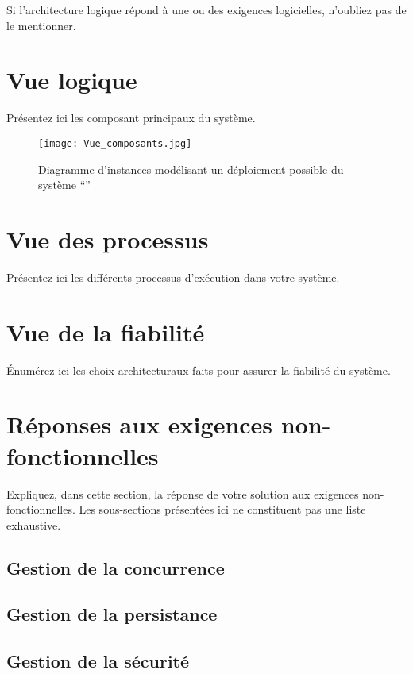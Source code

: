 Si l'architecture logique répond à une ou des exigences logicielles, n'oubliez pas de le mentionner.

\section{Vue logique}

Présentez ici les composant principaux du système.

\begin{figure}[!htbp]
\begin{center}
\caption{Diagramme d'instances modélisant un déploiement possible du système ``\projet{}''}
\texttt{[image: Vue\_composants.jpg]}
\end{center}
\end{figure} 

\section{Vue des processus}
Présentez ici les différents processus d'exécution dans votre système.

\section{Vue de la fiabilité}

Énumérez ici les choix architecturaux faits pour assurer la fiabilité du système.


\section{Réponses aux exigences non-fonctionnelles}
Expliquez, dans cette section, la réponse de votre solution aux exigences non-fonctionnelles. 
Les sous-sections présentées ici ne constituent pas une liste exhaustive. 

\subsection{Gestion de la concurrence}

\subsection{Gestion de la persistance}

\subsection{Gestion de la sécurité}



